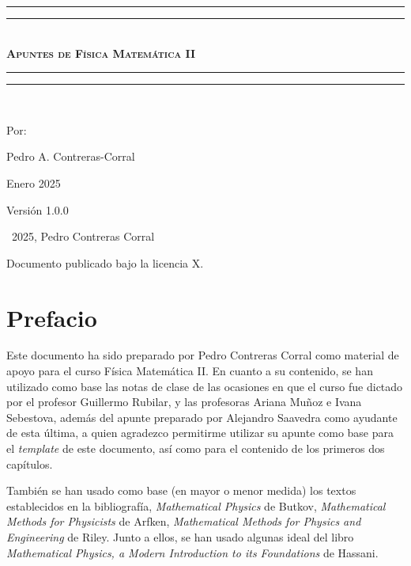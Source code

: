 \documentclass[letterpaper,12pt, twoside]{book}
\newlength{\drop}
\theoremstyle{definition}
\begin{document}
\newpage

\thispagestyle{empty}


\newpage

\begin{titlepage}
 \textheight
    \centering
    \vspace*{\baselineskip}
    \rule{\textwidth}{1.6pt}\vspace*{-\baselineskip}\vspace*{2pt}
    \rule{\textwidth}{0.4pt}\\[\baselineskip]
    {\scshape\bfseries\Huge{}\selectfont Apuntes de Física Matemática II} \\[0.2\baselineskip]
    \rule{\textwidth}{0.4pt}\vspace*{-\baselineskip}\vspace{3.2pt}
    \rule{\textwidth}{1.6pt}\\[\baselineskip]
    {\Large Por: \par}
{\large Pedro A. Contreras-Corral \par}
{\large Enero 2025 \par}
\vfill
{\large Versión 1.0.0 \par}
\end{titlepage}

\mbox{} 
\vfill
\textcopyright\ 2025, Pedro Contreras Corral %


Documento publicado bajo la licencia X.
\vspace{1cm} 

\restoregeometry

\chapter*{Prefacio}

Este documento ha sido preparado por Pedro Contreras Corral como material de apoyo para el curso Física Matemática II. En cuanto a su contenido, se han utilizado como base las notas de clase de las ocasiones en que el curso fue dictado por el profesor Guillermo Rubilar, y las profesoras Ariana Muñoz e Ivana Sebestova, además del apunte preparado por Alejandro Saavedra como ayudante de esta última, a quien agradezco permitirme utilizar su apunte como base para el \emph{template} de este documento, así como para el contenido de los primeros dos capítulos.

También se han usado como base (en mayor o menor medida) los textos establecidos en la bibliografía, \emph{Mathematical Physics} de Butkov, \emph{Mathematical Methods for Physicists} de Arfken, \emph{Mathematical Methods for Physics and Engineering} de Riley. Junto a ellos, se han usado algunas ideal del libro \emph{Mathematical Physics, a Modern Introduction to its Foundations} de Hassani.
\end{document}
